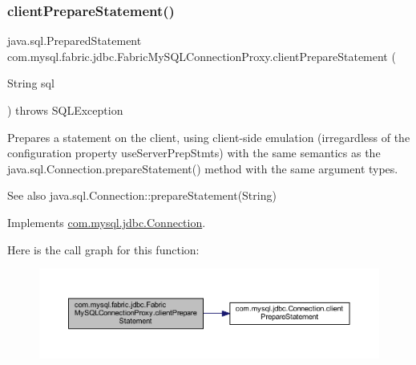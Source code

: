 \subsubsection{\texorpdfstring{client\+Prepare\+Statement()}{clientPrepareStatement()}\hspace{0.1cm}{\footnotesize\ttfamily [1/6]}}
{\footnotesize\ttfamily java.\+sql.\+Prepared\+Statement com.\+mysql.\+fabric.\+jdbc.\+Fabric\+My\+S\+Q\+L\+Connection\+Proxy.\+client\+Prepare\+Statement (\begin{DoxyParamCaption}\item[{String}]{sql }\end{DoxyParamCaption}) throws S\+Q\+L\+Exception}

Prepares a statement on the client, using client-\/side emulation (irregardless of the configuration property \textquotesingle{}use\+Server\+Prep\+Stmts\textquotesingle{}) with the same semantics as the java.\+sql.\+Connection.\+prepare\+Statement() method with the same argument types.

\begin{DoxySeeAlso}{See also}
java.\+sql.\+Connection\+::prepare\+Statement(\+String) 
\end{DoxySeeAlso}


Implements \mbox{\hyperlink{interfacecom_1_1mysql_1_1jdbc_1_1_connection_a1836d2e9bc2f4f47fb77b2418d08616a}{com.\+mysql.\+jdbc.\+Connection}}.

Here is the call graph for this function\+:\nopagebreak
\begin{figure}[H]
\begin{center}
\leavevmode
\includegraphics[width=350pt]{classcom_1_1mysql_1_1fabric_1_1jdbc_1_1_fabric_my_s_q_l_connection_proxy_a518405c081dacd0e856bead503a333e2_cgraph}
\end{center}
\end{figure}
\mbox{\label{classcom_1_1mysql_1_1fabric_1_1jdbc_1_1_fabric_my_s_q_l_connection_proxy_a60034988ae9a7aedd702c5228602b721}} 
